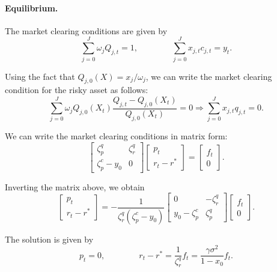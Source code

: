 \documentclass[11pt,english]{article}
\begin{document}
\paragraph{Equilibrium.} The market clearing conditions are given by 
\begin{equation}
    \sum_{j=0}^J \omega_j Q_{j,t} = 1, \qquad \qquad \sum_{j=0}^J x_{j,t} c_{j,t} = y_t.
\end{equation}

Using the fact that $Q_{j,0}(X) = x_j/\omega_j$, we can write the market clearing condition for the risky asset as follows:
\begin{equation}
    \sum_{j=0}^J \omega_j Q_{j,0}(X_t)\frac{Q_{j,t} - Q_{j,0}(X_t)}{Q_{j,0}(X_t)} = 0 \Rightarrow 
    \sum_{j=0}^J x_{j,t} q_{j,t} = 0.
\end{equation}

We can write the market clearing conditions in matrix form:
\begin{equation}
\left[ \begin{matrix}
\zeta_{p}^q & \zeta_r^q\\
\zeta_{p}^c-y_0 & 0
\end{matrix} \right] \left[ 
\begin{matrix}
    p_t\\
r_t-r^*
\end{matrix}
\right]
= \left[\begin{matrix}
    f_t\\
    0
\end{matrix} \right].
\end{equation}

Inverting the matrix above, we obtain
\begin{equation}
\left[ 
\begin{matrix}
    p_t\\
r_t-r^*
\end{matrix}
\right]
= - \frac{1}{\zeta_r^q(\zeta_p^c-y_0)}\left[ \begin{matrix}
0 & -\zeta_r^q\\
y_0-\zeta_{p}^c & \zeta_{p}^q
\end{matrix} \right] 
\left[\begin{matrix}
    f_t\\
    0
\end{matrix} \right].
\end{equation}

The solution is given by 
\begin{equation}
p_t = 0, \qquad \qquad 
r_t - r^* = \frac{1}{\zeta_r^q} f_t = \frac{\gamma \sigma^2}{1-x_0} f_t.
\end{equation}
\end{document}
